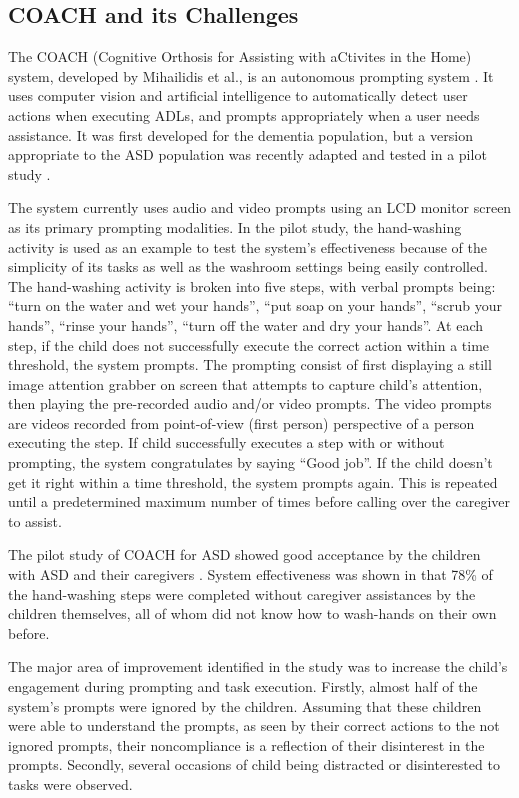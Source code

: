 \documentclass{ut-thesis}
\begin{document}
\subsection{COACH and its Challenges}

The COACH (Cognitive Orthosis for Assisting with aCtivites in the Home) system, developed by Mihailidis et al., is an autonomous prompting system \cite{mihailidis2008coach}.  It uses computer vision and artificial intelligence to automatically detect user actions when executing ADLs, and prompts appropriately when a user needs assistance.  It was first developed for the dementia population, but a version appropriate to the ASD population was recently adapted and tested in a pilot study \cite{bimbrahw2012investigating}.


The system currently uses audio and video prompts using an LCD monitor screen as its primary prompting modalities.  In the pilot study, the hand-washing activity is used as an example to test the system's effectiveness because of the simplicity of its tasks as well as the washroom settings being easily controlled.  The hand-washing activity is broken into five steps, with verbal prompts being: ``turn on the water and wet your hands'', ``put soap on your hands'', ``scrub your hands'', ``rinse your hands'', ``turn off the water and dry your hands''.  At each step, if the child does not successfully execute the correct action within a time threshold, the system prompts.  The prompting consist of first displaying a still image attention grabber on screen that attempts to capture child's attention, then playing the pre-recorded audio and/or video prompts.  The video prompts are videos recorded from point-of-view (first person) perspective of a person executing the step.  If child successfully executes a step with or without prompting, the system congratulates by saying ``Good job''.  If the child doesn't get it right within a time threshold, the system prompts again.  This is repeated until a predetermined maximum number of times before calling over the caregiver to assist.  


The pilot study of COACH for ASD showed good acceptance by the children with ASD and their caregivers \cite{bimbrahw2012investigating}.  System effectiveness was shown in that 78\% of the hand-washing steps were completed without caregiver assistances by the children themselves, all of whom did not know how to wash-hands on their own before.


The major area of improvement identified in the study was to increase the child's engagement during prompting and task execution.  Firstly, almost half of the system's prompts were ignored by the children.  Assuming that these children were able to understand the prompts, as seen by their correct actions to the not ignored prompts, their noncompliance is a reflection of their disinterest in the prompts.  Secondly, several occasions of child being distracted or disinterested to tasks were observed.
\end{document}
